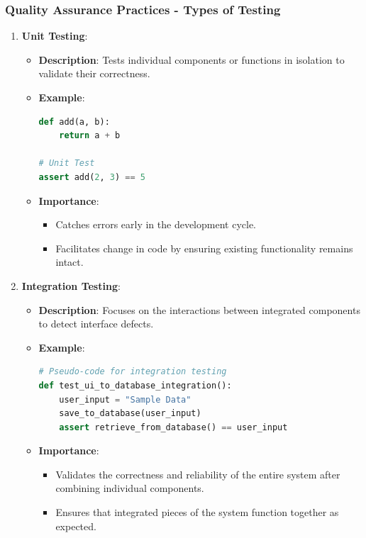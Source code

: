 \documentclass{beamer}
\begin{document}
\begin{frame}[fragile]
    \frametitle{Quality Assurance Practices - Types of Testing}
    \begin{enumerate}
        \item \textbf{Unit Testing}:
        \begin{itemize}
            \item \textbf{Description}: Tests individual components or functions in isolation to validate their correctness. 
            \item \textbf{Example}:
            \begin{lstlisting}[language=Python]
def add(a, b):
    return a + b

# Unit Test
assert add(2, 3) == 5
            \end{lstlisting}
            \item \textbf{Importance}:
            \begin{itemize}
                \item Catches errors early in the development cycle.
                \item Facilitates change in code by ensuring existing functionality remains intact.
            \end{itemize}
        \end{itemize}
        \item \textbf{Integration Testing}:
        \begin{itemize}
            \item \textbf{Description}: Focuses on the interactions between integrated components to detect interface defects.
            \item \textbf{Example}:
            \begin{lstlisting}[language=Python]
# Pseudo-code for integration testing
def test_ui_to_database_integration():
    user_input = "Sample Data"
    save_to_database(user_input)
    assert retrieve_from_database() == user_input
            \end{lstlisting}
            \item \textbf{Importance}:
            \begin{itemize}
                \item Validates the correctness and reliability of the entire system after combining individual components.
                \item Ensures that integrated pieces of the system function together as expected.
            \end{itemize}
        \end{itemize}
    \end{enumerate}
\end{frame}
\end{document}

